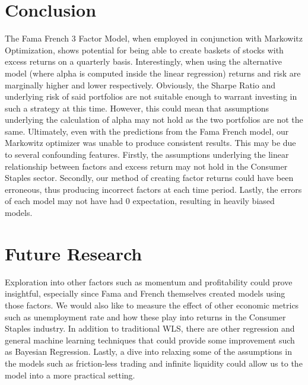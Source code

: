 \documentclass[final]{article}
\begin{document}
\section{Conclusion}

\hspace{\parindent}The Fama French 3 Factor Model, when employed in conjunction with Markowitz Optimization, shows potential for being able to create baskets of stocks with excess returns on a quarterly basis. Interestingly, when using the alternative model (where alpha is computed inside the linear regression) returns and risk are marginally higher and lower respectively. Obviously, the Sharpe Ratio and underlying risk of said portfolios are not suitable enough to warrant investing in such a strategy at this time. However, this could mean that assumptions underlying the calculation of alpha may not hold as the two portfolios are not the same. Ultimately, even with the predictions from the Fama French model, our Markowitz optimizer was unable to produce consistent results. This may be due to several confounding features. Firstly, the assumptions underlying the linear relationship between factors and excess return may not hold in the Consumer Staples sector. Secondly, our method of creating factor returns could have been erroneous, thus producing incorrect factors at each time period. Lastly, the errors of each model may not have had 0 expectation, resulting in heavily biased models.

\section{Future Research} 
\hspace{\parindent}Exploration into other factors such as momentum and profitability could prove insightful, especially since Fama and French themselves created models using those factors. We would also like to measure the effect of other economic metrics such as unemployment rate and how these play into returns in the Consumer Staples industry. In addition to traditional WLS, there are other regression and general machine learning techniques that could provide some improvement such as Bayesian Regression. Lastly, a dive into relaxing some of the assumptions in the models such as friction-less trading and infinite liquidity could allow us to the model into a more practical setting.

\clearpage

\printbibliography
\end{document}
